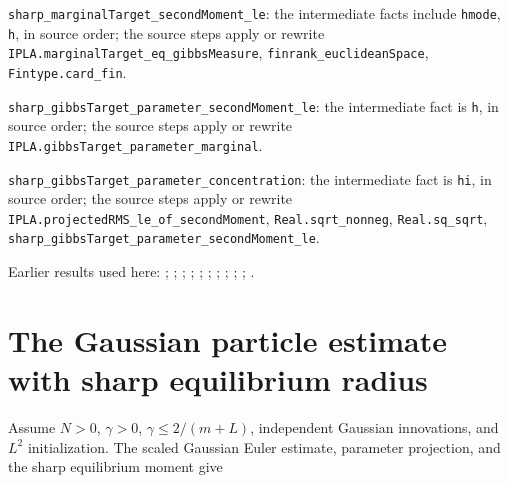 \documentclass[11pt,a4paper]{article}
\begin{document}
\begin{leanbox}
\texttt{sharp\_\allowbreak{}marginal\allowbreak{}Target\_\allowbreak{}second\allowbreak{}Moment\_\allowbreak{}le}: the intermediate facts include \texttt{hmode}, \texttt{h}, in source order; the source steps apply or rewrite \texttt{IPLA.\allowbreak{}marginal\allowbreak{}Target\_\allowbreak{}eq\_\allowbreak{}gibbs\allowbreak{}Measure}, \texttt{finrank\_\allowbreak{}euclidean\allowbreak{}Space}, \texttt{Fintype.\allowbreak{}card\_\allowbreak{}fin}.



\texttt{sharp\_\allowbreak{}gibbs\allowbreak{}Target\_\allowbreak{}parameter\_\allowbreak{}second\allowbreak{}Moment\_\allowbreak{}le}: the intermediate fact is \texttt{h}, in source order; the source steps apply or rewrite \texttt{IPLA.\allowbreak{}gibbs\allowbreak{}Target\_\allowbreak{}parameter\_\allowbreak{}marginal}.



\texttt{sharp\_\allowbreak{}gibbs\allowbreak{}Target\_\allowbreak{}parameter\_\allowbreak{}concentration}: the intermediate fact is \texttt{hi}, in source order; the source steps apply or rewrite \texttt{IPLA.\allowbreak{}projected\allowbreak{}RMS\_\allowbreak{}le\_\allowbreak{}of\_\allowbreak{}second\allowbreak{}Moment}, \texttt{Real.\allowbreak{}sqrt\_\allowbreak{}nonneg}, \texttt{Real.\allowbreak{}sq\_\allowbreak{}sqrt}, \texttt{sharp\_\allowbreak{}gibbs\allowbreak{}Target\_\allowbreak{}parameter\_\allowbreak{}second\allowbreak{}Moment\_\allowbreak{}le}.
\end{leanbox}


Earlier results used here: \cite[Section~3.26.13]{LangevinLean2026ULASC}; \cite[Section~3.26.15]{LangevinLean2026ULASC}; \cite[Section~3.26.3]{LangevinLean2026ULASC}; \cite[Section~3.1.1]{LangevinLean2026IPLA}; \cite[Section~3.1.3]{LangevinLean2026IPLA}; \cite[Section~3.1.6]{LangevinLean2026IPLA}; \cite[Section~3.12.1]{LangevinLean2026IPLA}; \cite[Section~3.13.1]{LangevinLean2026IPLA}; \cite[Section~3.3.1]{LangevinLean2026IPLA}; \cite[Section~3.3.2]{LangevinLean2026IPLA}; \cite[Section~3.9.9]{LangevinLean2026IPLA}.

\section{\texorpdfstring{The Gaussian particle estimate with sharp equilibrium radius}{The Gaussian particle estimate with sharp equilibrium radius}}


Assume \(N>0\), \(\gamma>0\), \(\gamma\le2/(m+L)\), independent Gaussian innovations, and \(L^2\) initialization. The scaled Gaussian Euler estimate, parameter projection, and the sharp equilibrium moment give
\end{document}
